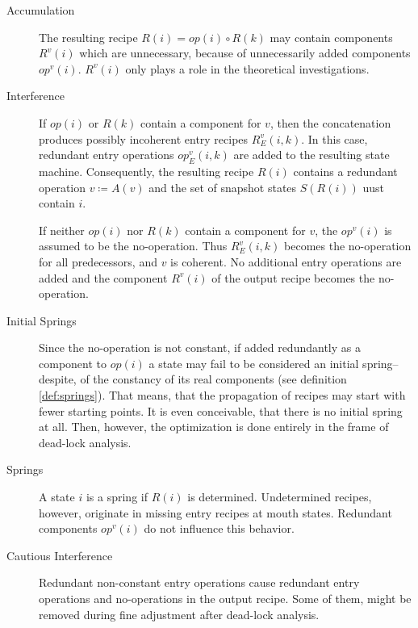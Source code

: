 \documentclass[12pt,a4paper]{scrartcl}
\begin{document}
\begin{description}
\item [Accumulation]

    The resulting recipe $R(i) = op(i)\circ R(k)$ may contain components
    $R^v(i)$ which are unnecessary, because of unnecessarily added components
    $op^v(i)$. $R^v(i)$ only plays a role in the theoretical investigations.

\item [Interference]

    If $op(i)$ or $R(k)$ contain a component for $v$, then the concatenation
    produces possibly incoherent entry recipes $R^v_E(i,k)$.  In this case,
    redundant entry operations $op_E^v(i,k)$ are added to the resulting state
    machine. Consequently, the resulting recipe $R(i)$ contains a redundant
    operation $v\coloneqq A(v)$ and the set of snapshot states $S(R(i))$ uust
    contain $i$.

    If neither $op(i)$ nor $R(k)$ contain a component for $v$, the $op^v(i)$ is
    assumed to be the no-operation. Thus $R_E^v(i,k)$ becomes the no-operation
    for all predecessors, and $v$ is coherent. No additional entry
    operations are added and the component $R^v(i)$ of the output recipe
    becomes the no-operation.

\item [Initial Springs]

    Since the no-operation is not constant, if added redundantly as a component
    to $op(i)$ a state may fail to be considered an initial spring--despite, of
    the constancy of its real components (see definition \ref{def:springs}).
    That means, that the propagation of recipes may start with fewer starting
    points. It is even conceivable, that there is no initial spring at all.
    Then, however, the optimization is done entirely in the frame of dead-lock
    analysis.

\item [Springs]

    A state $i$ is a spring if $R(i)$ is determined. Undetermined recipes,
    however, originate in missing entry recipes at mouth states. Redundant
    components $op^v(i)$ do not influence this behavior.

\item [Cautious Interference]

    Redundant non-constant entry operations cause redundant entry operations
    and no-operations in the output recipe. Some of them, might be removed
    during fine adjustment after dead-lock analysis.

\end{description}
\end{document}
